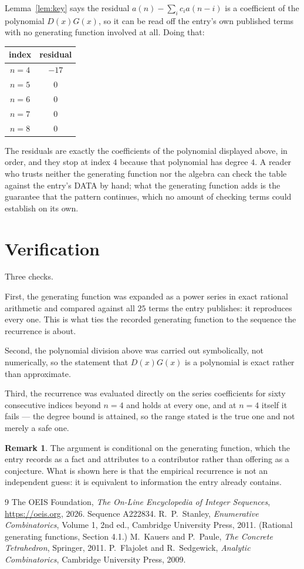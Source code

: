 \documentclass[11pt,a4paper]{article}
\theoremstyle{plain}
\theoremstyle{definition}
\newtheorem{remark}[theorem]{Remark}
\begin{document}
Lemma~\ref{lem:key} says the residual $a(n)-\sum_ic_ia(n-i)$ is a coefficient of the
polynomial $D(x)G(x)$, so it can be read off the entry's own published terms with no
generating function involved at all. Doing that:
\begin{center}
\begin{tabular}{cc}
index & residual \\ \hline
$n=4$ & $-17$ \\
$n=5$ & $0$ \\
$n=6$ & $0$ \\
$n=7$ & $0$ \\
$n=8$ & $0$
\end{tabular}
\end{center}
The residuals are exactly the coefficients of the polynomial displayed above, in order, and
they stop at index $4$ because that polynomial has degree $4$. A reader who trusts
neither the generating function nor the algebra can check the table against the entry's DATA
by hand; what the generating function adds is the guarantee that the pattern continues, which
no amount of checking terms could establish on its own.

\section{Verification}

Three checks.

First, the generating function was expanded as a power series in exact rational arithmetic and
compared against all $25$ terms the entry publishes: it reproduces every one. This is
what ties the recorded generating function to the sequence the recurrence is about.

Second, the polynomial division above was carried out symbolically, not numerically, so the
statement that $D(x)G(x)$ is a polynomial is exact rather than approximate.

Third, the recurrence was evaluated directly on the series coefficients for sixty consecutive
indices beyond $n=4$ and holds at every one, and at $n=4$ itself it fails --- the
degree bound is attained, so the range stated is the true one and not merely a safe one.

\begin{remark}
The argument is conditional on the generating function, which the entry records as a fact and
attributes to a contributor rather than offering as a conjecture. What is shown here is that
the empirical recurrence is not an independent guess: it is equivalent to information the
entry already contains.
\end{remark}

\begin{thebibliography}{9}
 The OEIS Foundation, \emph{The On-Line Encyclopedia of Integer
Sequences}, \url{https://oeis.org}, 2026. Sequence A222834.
 R.~P.~Stanley, \emph{Enumerative Combinatorics}, Volume 1, 2nd ed.,
Cambridge University Press, 2011. (Rational generating functions, Section 4.1.)
 M.~Kauers and P.~Paule, \emph{The Concrete Tetrahedron}, Springer, 2011.
 P.~Flajolet and R.~Sedgewick, \emph{Analytic Combinatorics}, Cambridge
University Press, 2009.
\end{thebibliography}
\end{document}
